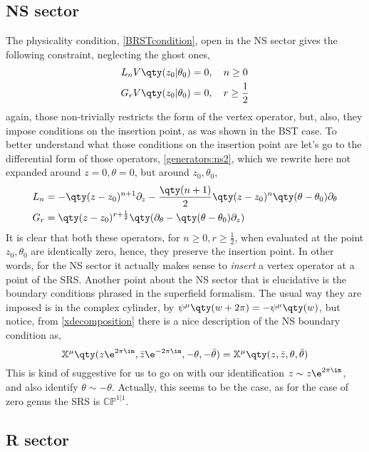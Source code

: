 \subsection{NS sector}

The physicality condition, \cref{BRSTcondition}, open in the NS sector gives the following constraint, neglecting the ghost ones,
\begin{align*}
    L_n V\qty(z_0|\theta_0)&=0,\ \ \ n\geq 0\\
    G_r V\qty(z_0|\theta_0)&=0,\ \ \ r\geq \frac12
\end{align*}
again, those non-trivially restricts the form of the vertex operator, but, also, 
they impose conditions on the insertion point, as was shown in the BST case. To 
better understand what those conditions on the insertion point are let's go to the 
differential form of those operators, \cref{generators:ns2}, which we rewrite here not 
expanded around $z=0,\theta=0$, but around $z_0,\theta_0$,
\begin{align*}
    L_n&=-\qty(z-z_0)^{n+1}\partial_z-\frac{\qty(n+1)}{2}\qty(z-z_0)^n\qty(\theta-\theta_0)\partial_\theta\\
    G_r&=\qty(z-z_0)^{r+\frac12}\qty(\partial_\theta-\qty(\theta-\theta_0)\partial_z)
\end{align*}
It is clear that both these operators, for $n\geq0,r\geq\frac12$, when evaluated at the point $z_0,\theta_0$ are 
identically zero, hence, they preserve the insertion point. In other words, for the NS sector it actually 
makes sense to \textit{insert} a vertex operator at a point of the SRS. Another point about the NS sector 
that is elucidative is the boundary conditions phrased in the superfield formalism. The usual 
way they are imposed is in the complex cylinder, by $\psi^\mu\qty(w+2\pi)=-\psi^\mu\qty(w)$, but notice, 
from \cref{xdecomposition} there is a nice description of the NS boundary condition as, 
\[\mathbb X^\mu\qty(z\e^{2\pi\im},\bar z\e^{-2\pi\im},-\theta,-\bar\theta)=\mathbb X^\mu\qty(z,\bar z,\theta,\bar\theta)\] 
This is kind of suggestive for us to go on with our identification $z\sim z\e^{2\pi\im}$, and also identify $\theta\sim-\theta$. 
Actually, this seems to be the case, as for the case of zero genus the SRS is $\mathbb{CP}^{1|1}$.

\subsection{R sector}

